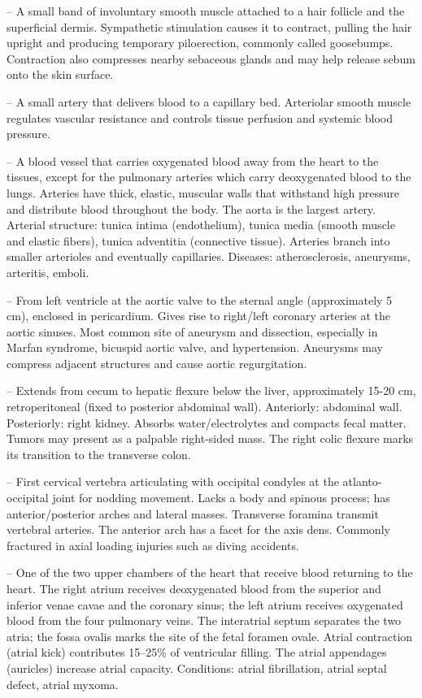 -- A small band of involuntary smooth muscle attached to a hair follicle and the superficial dermis. Sympathetic stimulation causes it to contract, pulling the hair upright and producing temporary piloerection, commonly called goosebumps. Contraction also compresses nearby sebaceous glands and may help release sebum onto the skin surface.

-- A small artery that delivers blood to a capillary bed. Arteriolar smooth muscle regulates vascular resistance and controls tissue perfusion and systemic blood pressure.

-- A blood vessel that carries oxygenated blood away from the heart to the tissues, except for the pulmonary arteries which carry deoxygenated blood to the lungs. Arteries have thick, elastic, muscular walls that withstand high pressure and distribute blood throughout the body. The aorta is the largest artery. Arterial structure: tunica intima (endothelium), tunica media (smooth muscle and elastic fibers), tunica adventitia (connective tissue). Arteries branch into smaller arterioles and eventually capillaries. Diseases: atherosclerosis, aneurysms, arteritis, emboli.

-- From left ventricle at the aortic valve to the sternal angle (approximately 5 cm), enclosed in pericardium. Gives rise to right/left coronary arteries at the aortic sinuses. Most common site of aneurysm and dissection, especially in Marfan syndrome, bicuspid aortic valve, and hypertension. Aneurysms may compress adjacent structures and cause aortic regurgitation.

-- Extends from cecum to hepatic flexure below the liver, approximately 15-20 cm, retroperitoneal (fixed to posterior abdominal wall). Anteriorly: abdominal wall. Posteriorly: right kidney. Absorbs water/electrolytes and compacts fecal matter. Tumors may present as a palpable right-sided mass. The right colic flexure marks its transition to the transverse colon.

-- First cervical vertebra articulating with occipital condyles at the atlanto-occipital joint for nodding movement. Lacks a body and spinous process; has anterior/posterior arches and lateral masses. Transverse foramina transmit vertebral arteries. The anterior arch has a facet for the axis dens. Commonly fractured in axial loading injuries such as diving accidents.

-- One of the two upper chambers of the heart that receive blood returning to the heart. The right atrium receives deoxygenated blood from the superior and inferior venae cavae and the coronary sinus; the left atrium receives oxygenated blood from the four pulmonary veins. The interatrial septum separates the two atria; the fossa ovalis marks the site of the fetal foramen ovale. Atrial contraction (atrial kick) contributes 15--25\% of ventricular filling. The atrial appendages (auricles) increase atrial capacity. Conditions: atrial fibrillation, atrial septal defect, atrial myxoma.

